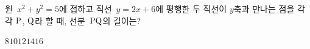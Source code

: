 원~$x^2+y^2=5$에 접하고 직선~$y=2x+6$에 평행한 두 직선이 $y$축과 만나는 점을 각각 $\mathrm{P}$, $\mathrm{Q}$라 할 때, 선분~$\mathrm{PQ}$의 길이는?
\begin{choices32}{$8$}{$10$}{$12$}{$14$}{$16$}\end{choices32}
